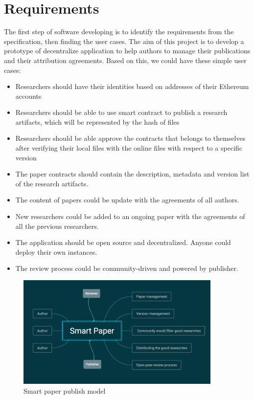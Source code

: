 \documentclass[openany,12pt]{ecsthesis}      %
\begin{document}
\section{Requirements}
The first step of software developing is to identify the requirements from the specification,
then finding the user cases.
The aim of this project is to develop a prototype of decentralize application 
to help authors to manage their publications and their attribution agreements.
Based on this, we could have these simple user cases:
\begin{itemize}
  \item Researchers should have their identities based on addresses of their Ethereum accounts
  \item Researchers should be able to use smart contract to publish a research artifacts, which will be represented by the hash of files
  \item Researchers should be able approve the contracts that belongs to themselves after verifying their local files with the online files with respect to a specific version
  \item The paper contracts should contain the description, metadata and version list of the research artifacts.
  \item The content of papers could be update with the agreements of all authors. 
  \item New researchers could be added to an ongoing paper with the agreements of all the previous researchers.
  \item The application should be open source and decentralized. Anyone could deploy their own instances.
  \item The review process could be community-driven and powered by publisher.
\end{itemize}
\begin{figure}[H]
  \centering
  \includegraphics[width=0.9\textwidth]{smartPaperModel.png}
  \caption{Smart paper publish model}
  \label{smartPaper}
\end{figure}
\end{document}
